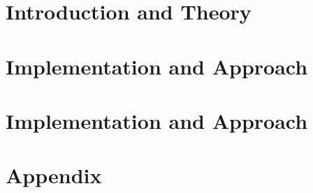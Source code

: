 \documentclass[11pt,a4paper,biblography=totoc,index=totoc,headsepline,footsepline,footinlcude=false,BCOR12mm,DIV13]{scrbook}
\begin{document}
 \frontmatter



%
%	


%	

 

 

 

 


 \tableofcontents

 

 \mainmatter


	 \part[Introduction and Theory]{Introduction and Theory}
	 \label{part:introAndBackgroundTheory}
	 
	 



	 \part[Implementation and Experiments]{Implementation and Approach}
   
	 \label{part:secondP}

	 \part[Implementation and Experiments]{Implementation and Approach}
   
	 \label{part:thirdP}



	 \part*{Appendix}

	 \appendix %

	 




 \clearemptydoublepage

 \printglossaries



 
\end{document}

